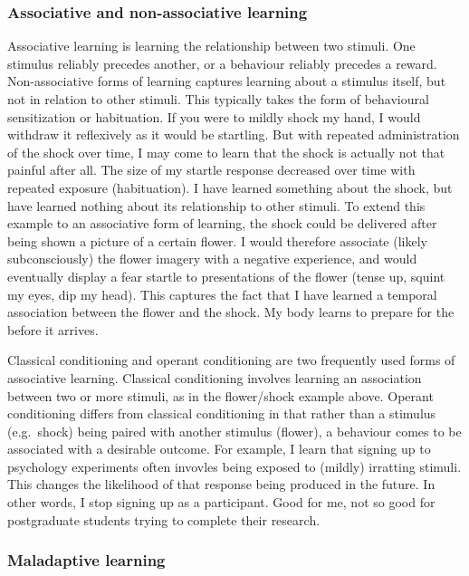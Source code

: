 \documentclass[
  letterpaper,
  DIV=11,
  numbers=noendperiod,
  oneside]{scrartcl}
\begin{document}
\subsubsection{Associative and non-associative
learning}\label{associative-and-non-associative-learning}

Associative learning is learning the relationship between two stimuli.
One stimulus reliably precedes another, or a behaviour reliably precedes
a reward. Non-associative forms of learning captures learning about a
stimulus itself, but not in relation to other stimuli. This typically
takes the form of behavioural sensitization or habituation. If you were
to mildly shock my hand, I would withdraw it reflexively as it would be
startling. But with repeated administration of the shock over time, I
may come to learn that the shock is actually not that painful after all.
The size of my startle response decreased over time with repeated
exposure (habituation). I have learned something about the shock, but
have learned nothing about its relationship to other stimuli. To extend
this example to an associative form of learning, the shock could be
delivered after being shown a picture of a certain flower. I would
therefore associate (likely subconsciously) the flower imagery with a
negative experience, and would eventually display a fear startle to
presentations of the flower (tense up, squint my eyes, dip my head).
This captures the fact that I have learned a temporal association
between the flower and the shock. My body learns to prepare for the
before it arrives.

Classical conditioning and operant conditioning are two frequently used
forms of associative learning. Classical conditioning involves learning
an association between two or more stimuli, as in the flower/shock
example above. Operant conditioning differs from classical conditioning
in that rather than a stimulus (e.g.~shock) being paired with another
stimulus (flower), a behaviour comes to be associated with a desirable
outcome. For example, I learn that signing up to psychology experiments
often invovles being exposed to (mildly) irratting stimuli. This changes
the likelihood of that response being produced in the future. In other
words, I stop signing up as a participant. Good for me, not so good for
postgraduate students trying to complete their research.

\subsubsection{Maladaptive learning}\label{maladaptive-learning}
\end{document}
